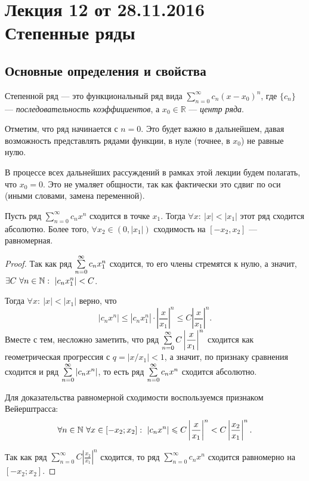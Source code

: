 \documentclass[a4paper, 12pt]{article}
\begin{document}
\pagestyle{fancy}
\section{Лекция 12 от 28.11.2016 \\ Степенные ряды}

\subsection{Основные определения и свойства}
\begin{Def}
	Степенной ряд --- это функциональный ряд вида $\sum\limits_{n = 0}^{\infty}c_n (x-x_0)^n$, где $\{c_n\}$ --- \textit{последовательность коэффициентов}, а $x_0 \in \mathbb{R}$ ---  \textit{центр ряда}.
\end{Def}

Отметим, что ряд начинается с $n = 0$. Это будет важно в дальнейшем, давая возможность представлять рядами функции, в нуле (точнее, в $x_0$) не равные нулю.

В процессе всех дальнейших рассуждений в рамках этой лекции будем полагать, что $x_0 = 0$. Это не умаляет общности, так как фактически это сдвиг по оси (иными словами, замена переменной).

\begin{Theorem} [Абеля I]
	Пусть ряд $\sum\limits_{n = 0}^{\infty}c_n x^n$ сходится в точке $x_1$. Тогда $\forall x:\ |x| < |x_1|$ этот ряд сходится абсолютно. Более того, $\forall x_2 \in (0, |x_1|)$ сходимость на $[-x_2, x_2]$ --- равномерная.
\end{Theorem}
\begin{proof}
	Так как ряд $\sum\limits_{n=0}^{\infty} c_nx_1^n$ сходится, то его члены стремятся к нулю, а значит, $\exists C\ \forall n \in \mathbb{N}:\ |c_nx_1^n| < C$. 
	
	Тогда $\forall x:\ |x| < |x_1|$ верно, что 
	$$
	|c_nx^n| \leq |c_nx_1^n| \cdot \left| \dfrac{x}{x_1} \right|^n \leq C \left| \dfrac{x}{x_1} \right|^n.
	$$
	Вместе с тем, несложно заметить, что ряд $\sum\limits_{n=0}^{\infty} C \left|\dfrac{x}{x_1}\right|^n$ сходится как геометрическая прогрессия с $q = |x/x_1| < 1$, а значит, по признаку сравнения сходится и ряд $\sum\limits_{n=0}^{\infty} |c_nx^n|$, то есть ряд $\sum\limits_{n=0}^{\infty} c_nx^n$ сходится абсолютно.
	
	Для доказательства равномерной сходимости воспользуемся признаком Вейерштрасса:
	$$
	\forall n \in \mathbb{N}\ \forall x \in [-x_2; x_2]:\ |c_nx^n| \leqslant C\left|\frac{x}{x_1} \right|^n < C\left|\frac{x_2}{x_1}\right|^n.
	$$
	
	Так как ряд $\sum\limits_{n=0}^{\infty} C\left|\frac{x_2}{x_1} \right|^n$ сходится, то ряд $\sum\limits_{n = 0}^{\infty}c_n x^n$ сходится равномерно на $[-x_2; x_2]$.
\end{proof}
\end{document}
